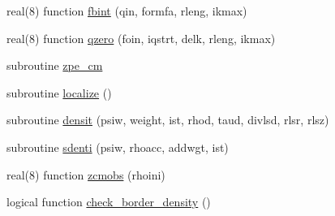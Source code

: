 \begin{DoxyCompactItemize}
real(8) function \hyperlink{namespaceobserv_a7a329dea033cb1606639d5deb6aaad29}{fbint} (qin, formfa, rleng, ikmax)
\item 
real(8) function \hyperlink{namespaceobserv_a8fe61665a4670e6215ecc9db5d6478b2}{qzero} (foin, iqstrt, delk, rleng, ikmax)
\item 
subroutine \hyperlink{namespaceobserv_a4ccae3e6386e9f57519189540c0a541c}{zpe\+\_\+cm}
\item 
subroutine \hyperlink{namespaceobserv_a56772dd19b8a5af560935df604c30315}{localize} ()
\item 
subroutine \hyperlink{namespaceobserv_a6400bb0d7fd8f21ce1ff763fcfebe70d}{densit} (psiw, weight, ist, rhod, taud, divlsd, rlsr, rlsz)
\item 
subroutine \hyperlink{namespaceobserv_a7bdfb81b161bdc113076f9e9cdc24b46}{sdenti} (psiw, rhoacc, addwgt, ist)
\item 
real(8) function \hyperlink{namespaceobserv_ac34a8711125703b516871b1323fcffe5}{zcmobs} (rhoini)
\item 
logical function \hyperlink{namespaceobserv_ad3ede781f00b650dd45cf509ffcd81b5}{check\+\_\+border\+\_\+density} ()
\end{DoxyCompactItemize}
